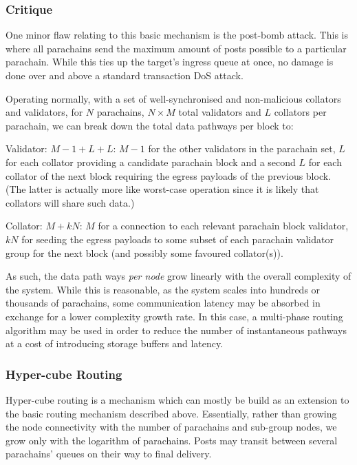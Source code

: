 \documentclass[9pt,oneside]{amsart}
\begin{document}
\begin{multicols}{2}
\subsubsection{Critique}
\label{critique}

 One minor flaw relating to this basic mechanism is the post-bomb attack. This is where all parachains send the maximum amount of posts possible to a particular parachain. While this ties up the target's ingress queue at once, no damage is done over and above a standard transaction DoS attack.

 Operating normally, with a set of well-synchronised and non-malicious collators and validators, for $N$ parachains, $N \times M$ total validators and $L$ collators per parachain, we can break down the total data pathways per block to:

 Validator: $M - 1 + L + L$: $M - 1$ for the other validators in the parachain set, $L$ for each collator providing a candidate parachain block and a second $L$ for each collator of the next block requiring the egress payloads of the previous block. (The latter is actually more like worst-case operation since it is likely that collators will share such data.)

 Collator: $M + kN$: $M$ for a connection to each relevant parachain block validator, $kN$ for seeding the egress payloads to some subset of each parachain validator group for the next block (and possibly some favoured collator(s)).

As such, the data path ways \emph{per node} grow linearly with the overall complexity of the system. While this is reasonable, as the system scales into hundreds or thousands of parachains, some communication latency may be absorbed in exchange for a lower complexity growth rate. In this case, a multi-phase routing algorithm may be used in order to reduce the number of instantaneous pathways at a cost of introducing storage buffers and latency.

\subsubsection{Hyper-cube Routing}
\label{hyper-cube-routing}

 Hyper-cube routing is a mechanism which can mostly be build as an extension to the basic routing mechanism described above. Essentially, rather than growing the node connectivity with the number of parachains and sub-group nodes, we grow only with the logarithm of parachains. Posts may transit between several parachains' queues on their way to final delivery.


\end{multicols}
\end{document}
